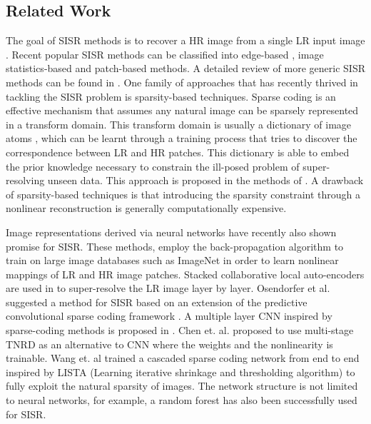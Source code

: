 \documentclass[10pt,twocolumn,letterpaper]{article}
\begin{document}
\subsection{Related Work}

The goal of \ac{SISR} methods is to recover a \ac{HR} image from a single \ac{LR} input image \cite{glasner2009super}. Recent popular \ac{SISR} methods can be classified into edge-based \cite{sun2011gradient}, image statistics-based \cite{efrat2013accurate,he2011single,yang2013fast,fernandez2013super} and patch-based \cite{chang2004super,wang2012semi,zhang2012multi,gao2012image,zhu2014single,timofte2014a+,dai2015jointly} methods. A detailed review of more generic \ac{SISR} methods can be found in \cite{yang2014single}. One family of approaches that has recently thrived in tackling the \ac{SISR} problem is sparsity-based techniques. Sparse coding is an effective mechanism that assumes any natural image can be sparsely represented in a transform domain. This transform domain is usually a dictionary of image atoms \cite{Mallat:2008:WTS:1525499,Elad:2010:SRR:1895005}, which can be learnt through a training process that tries to discover the correspondence between \ac{LR} and \ac{HR} patches. This dictionary is able to embed the prior knowledge necessary to constrain the ill-posed problem of super-resolving unseen data. This approach is proposed in the methods of \cite{Yang2010c, Dong2011}. A drawback of sparsity-based techniques is that introducing the sparsity constraint through a nonlinear reconstruction is generally computationally expensive.

Image representations derived via neural networks \cite{krizhevsky2012imagenet,zeiler2014visualizing,simonyan2014very} have recently also shown promise for \ac{SISR}. These methods, employ the back-propagation algorithm \cite{le1990handwritten} to train on large image databases such as ImageNet \cite{russakovsky2014imagenet} in order to learn nonlinear mappings of \ac{LR} and \ac{HR} image patches. Stacked collaborative local auto-encoders are used in \cite{cui2014deep} to  super-resolve the \ac{LR} image layer by layer. Osendorfer et al. \cite{osendorfer2014image} suggested a method for \ac{SISR} based on an extension of the predictive convolutional sparse coding framework \cite{poultney2006efficient}. A multiple layer \ac{CNN} inspired by sparse-coding methods is proposed in \cite{dong2015image}. Chen et. al. \cite{chen2015trainable} proposed to use multi-stage \ac{TNRD} as an alternative to \ac{CNN} where the weights and the nonlinearity is trainable. Wang et. al \cite{wang2015deeply} trained a cascaded sparse coding network from end to end inspired by LISTA (Learning iterative shrinkage and thresholding algorithm) \cite{gregor2010learning} to fully exploit the natural sparsity of images. The network structure is not limited to neural networks, for example, a random forest \cite{schulter2015fast} has also been successfully used for \ac{SISR}.
\end{document}
